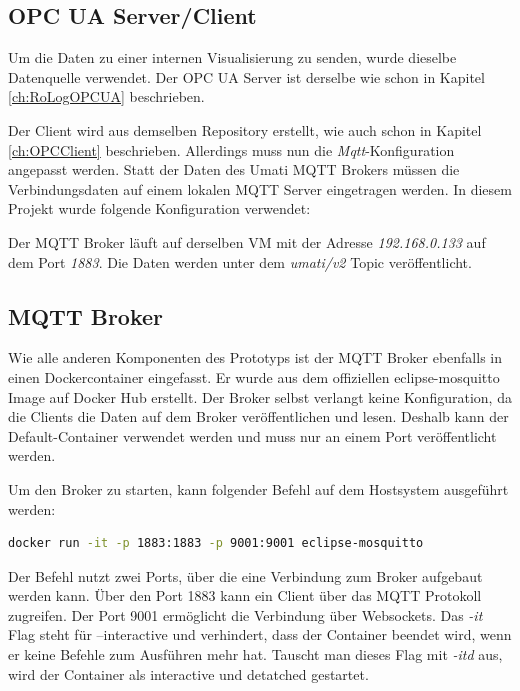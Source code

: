 \documentclass[a4paper, 12pt, oneside, toc=listofnumbered, bibliography=totoc]{scrbook}
\begin{document}
		\subsection{OPC UA Server/Client}
		
		Um die Daten zu einer internen Visualisierung zu senden, wurde dieselbe Datenquelle verwendet. Der OPC UA Server ist derselbe wie schon in Kapitel \ref{ch:RoLogOPCUA} beschrieben. 
		
		Der Client wird aus demselben Repository erstellt, wie auch schon in Kapitel \ref{ch:OPCClient} beschrieben. Allerdings muss nun die \textit{Mqtt}-Konfiguration angepasst werden. Statt der Daten des Umati MQTT Brokers müssen die Verbindungsdaten auf einem lokalen MQTT Server eingetragen werden. In diesem Projekt wurde folgende Konfiguration verwendet:
		
		
		
		Der MQTT Broker läuft auf derselben VM mit der Adresse \textit{192.168.0.133} auf dem Port \textit{1883}. Die Daten werden unter dem \textit{umati/v2} Topic veröffentlicht. 
		
		\subsection{MQTT Broker}\label{ch:MQTT Broker}
		
		Wie alle anderen Komponenten des Prototyps ist der MQTT Broker ebenfalls in einen Dockercontainer eingefasst. Er wurde aus dem offiziellen eclipse-mosquitto Image auf Docker Hub erstellt. Der Broker selbst verlangt keine Konfiguration, da die Clients die Daten auf dem Broker veröffentlichen und lesen. Deshalb kann der Default-Container verwendet werden und muss nur an einem Port veröffentlicht werden.
		
		Um den Broker zu starten, kann folgender Befehl auf dem Hostsystem ausgeführt werden:
		
		\begin{lstlisting}[numbers=none, language=bash, frame=single]
			docker run -it -p 1883:1883 -p 9001:9001 eclipse-mosquitto
		\end{lstlisting}
	
		Der Befehl nutzt zwei Ports, über die eine Verbindung zum Broker aufgebaut werden kann. Über den Port 1883 kann ein Client über das MQTT Protokoll zugreifen. Der Port 9001 ermöglicht die Verbindung über Websockets. Das \textit{-it} Flag steht für --interactive und verhindert, dass der Container beendet wird, wenn er keine Befehle zum Ausführen mehr hat. Tauscht man dieses Flag mit \textit{-itd} aus, wird der Container als interactive und detatched gestartet.
		
\end{document}
